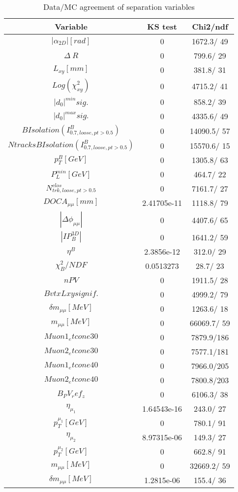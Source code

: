 \documentclass{article}
\begin{document}
\begin{table}[htbp]
\caption{\label{tab:sepVars}Data/MC agreement of separation variables}
\begin{center}
\begin{tabular}{c|c|c}
Variable & KS test & Chi2/ndf \\
\hline
$|\alpha_{2D}| [rad]$ & 0 & 1672.3/ 49\\
\hline
$\Delta~R$ & 0 & 799.6/ 29\\
\hline
$L_{xy} [mm]$ & 0 & 381.8/ 31\\
\hline
$Log(\chi^{2}_{xy})$ & 0 & 4715.2/ 41\\
\hline
$|d_{0}|^{min} sig.$ & 0 & 858.2/ 39\\
\hline
$|d_{0}|^{max} sig.$ & 0 & 4335.6/ 49\\
\hline
$B Isolation (I^{B}_{0.7, loose, pt>0.5})$ & 0 & 14090.5/ 57\\
\hline
$Ntracks B Isolation (I^{B}_{0.7, loose, pt>0.5})$ & 0 & 15570.6/ 15\\
\hline
$p_{T}^{B} [GeV]$ & 0 & 1305.8/ 63\\
\hline
$P^{min}_{L} [GeV]$ & 0 & 464.7/ 22\\
\hline
$N^{clos}_{trk, loose, pt>0.5}$ & 0 & 7161.7/ 27\\
\hline
$DOCA_{\mu\mu} [mm]$ & 2.41705e-11 & 1118.8/ 79\\
\hline
$|\Delta\phi_{\mu\mu}|$ & 0 & 4407.6/ 65\\
\hline
$|IP_{B}^{3D}|$ & 0 & 1641.2/ 59\\
\hline
$\eta^{B}$ & 2.3856e-12 & 312.0/ 29\\
\hline
$\chi^{2}_{B}/NDF$ & 0.0513273 &  28.7/ 23\\
\hline
$nPV$ & 0 & 1911.5/ 28\\
\hline
$BvtxLxy signif.$ & 0 & 4999.2/ 79\\
\hline
$\delta m_{\mu\mu} [MeV]$ & 0 & 1263.6/ 18\\
\hline
$m_{\mu\mu} [MeV]$ & 0 & 66069.7/ 59\\
\hline
$Muon1_etcone30$ & 0 & 7879.9/186\\
\hline
$Muon2_etcone30$ & 0 & 7577.1/181\\
\hline
$Muon1_etcone40$ & 0 & 7966.0/205\\
\hline
$Muon2_etcone40$ & 0 & 7800.8/203\\
\hline
$B_PV_ref_z$ & 0 & 6106.3/ 38\\
\hline
$\eta_{\mu_{1}}$ & 1.64543e-16 & 243.0/ 27\\
\hline
$p_{T}^{\mu_{1}} [GeV]$ & 0 & 780.1/ 91\\
\hline
$\eta_{\mu_{2}}$ & 8.97315e-06 & 149.3/ 27\\
\hline
$p_{T}^{\mu_{2}} [GeV]$ & 0 & 662.8/ 91\\
\hline
$m_{\mu\mu} [MeV]$ & 0 & 32669.2/ 59\\
\hline
$\delta m_{\mu\mu} [MeV]$ & 1.2815e-06 & 155.4/ 36\\
\hline
\end{tabular}
\end{center}
\end{table}
\end{document}
